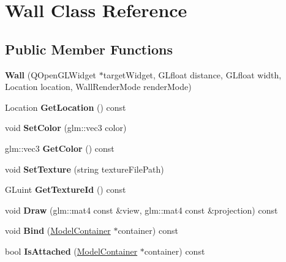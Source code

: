 \hypertarget{class_wall}{}\section{Wall Class Reference}
\label{class_wall}
\subsection*{Public Member Functions}
\begin{DoxyCompactItemize}
\item 
\hypertarget{class_wall_a63c0ce873bd396cd64328bc789d9b52d}{}{\bfseries Wall} (Q\+Open\+G\+L\+Widget $\ast$target\+Widget, G\+Lfloat distance, G\+Lfloat width, Location location, Wall\+Render\+Mode render\+Mode)\label{class_wall_a63c0ce873bd396cd64328bc789d9b52d}

\item 
\hypertarget{class_wall_a69e3d769d03cc7710cff5ec12016d041}{}Location {\bfseries Get\+Location} () const \label{class_wall_a69e3d769d03cc7710cff5ec12016d041}

\item 
\hypertarget{class_wall_a25a9a26b711c82e87b4c62c0f0e310a4}{}void {\bfseries Set\+Color} (glm\+::vec3 color)\label{class_wall_a25a9a26b711c82e87b4c62c0f0e310a4}

\item 
\hypertarget{class_wall_a702eceba533217b2c8fe32e35bdc1a55}{}glm\+::vec3 {\bfseries Get\+Color} () const \label{class_wall_a702eceba533217b2c8fe32e35bdc1a55}

\item 
\hypertarget{class_wall_a6fc29461ede774d8d87019b7f002d15a}{}void {\bfseries Set\+Texture} (string texture\+File\+Path)\label{class_wall_a6fc29461ede774d8d87019b7f002d15a}

\item 
\hypertarget{class_wall_a37e7497af0a99b1093dd54dfd6bd90cf}{}G\+Luint {\bfseries Get\+Texture\+Id} () const \label{class_wall_a37e7497af0a99b1093dd54dfd6bd90cf}

\item 
\hypertarget{class_wall_ac5293b39064ec52d57c90023481bc047}{}void {\bfseries Draw} (glm\+::mat4 const \&view, glm\+::mat4 const \&projection) const \label{class_wall_ac5293b39064ec52d57c90023481bc047}

\item 
\hypertarget{class_wall_a90d245563ab3c20a09bd6596f4ea2657}{}void {\bfseries Bind} (\hyperlink{class_model_container}{Model\+Container} $\ast$container) const \label{class_wall_a90d245563ab3c20a09bd6596f4ea2657}

\item 
\hypertarget{class_wall_a66a659d911e11bf8b91e5e7fe151baee}{}bool {\bfseries Is\+Attached} (\hyperlink{class_model_container}{Model\+Container} $\ast$container) const \label{class_wall_a66a659d911e11bf8b91e5e7fe151baee}

\end{DoxyCompactItemize}
